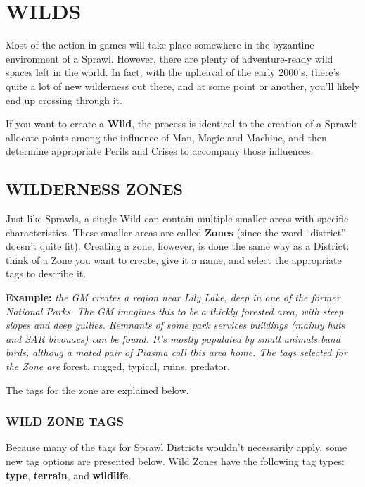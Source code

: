 \documentclass[oneside,10pt]{article}
\begin{document}
\section{WILDS}
\begin{multicols}{2}
Most of the action in \SW{} games will take place somewhere in the byzantine environment of a Sprawl. However,
there are plenty of adventure-ready wild spaces left in the
world. In fact, with the upheaval of the early 2000’s, there’s
quite a lot of new wilderness out there, and at some point or
another, you’ll likely end up crossing through it.

If you want to create a \textbf{Wild}, the process is identical to the
creation of a Sprawl: allocate points among the influence of
Man, Magic and Machine, and then determine appropriate
Perils and Crises to accompany those influences.

\subsection{WILDERNESS ZONES}
Just like Sprawls, a single Wild can contain multiple smaller areas with specific characteristics. These smaller areas are
called \textbf{Zones} (since the word “district” doesn’t quite fit). Creating a zone, however, is done the same way as a District:
think of a Zone you want to create, give it a name, and select
the appropriate tags to describe it.
\begin{adjustwidth*}{.5cm}{.5cm}

\textbf{Example:} \textit{the GM creates a region near Lily Lake, deep in
one of the former National Parks. The GM imagines this
to be a thickly forested area, with steep slopes and deep
gullies. Remnants of some park services buildings (mainly
huts and SAR bivouacs) can be found. It’s mostly populated by small animals band birds, althoug a mated pair of
Piasma call this area home. The tags selected for the Zone
are} forest, rugged, typical, ruins, predator.
\end{adjustwidth*}

The tags for the zone are explained below.

\subsubsection{WILD ZONE TAGS}
Because many of the tags for Sprawl Districts wouldn’t necessarily apply, some new tag options are presented below.
Wild Zones have the following tag types: \textbf{type}, \textbf{terrain}, and
\textbf{wildlife}.


\end{multicols}
\end{document}
